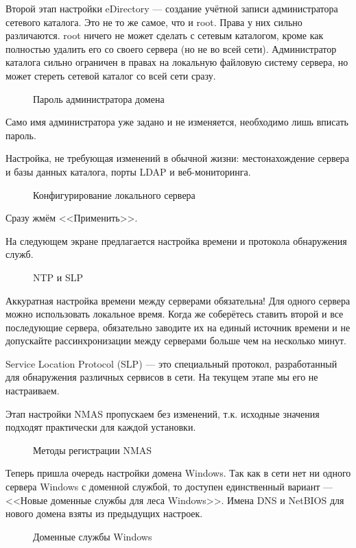 Второй этап настройки eDirectory --- создание учётной записи администратора сетевого каталога. Это не то же самое, что и root. Права у них сильно различаются. root ничего не может сделать с сетевым каталогом, кроме как полностью удалить его со своего сервера (но не во всей сети). Администратор каталога сильно ограничен в правах на локальную файловую систему сервера, но может стереть сетевой каталог со всей сети сразу.
\begin{figure}[H]
\caption{Пароль администратора домена}
\end{figure}
Само имя администратора уже задано и не изменяется, необходимо лишь вписать пароль.
\clearpage

Настройка, не требующая изменений в обычной жизни: местонахождение сервера и базы данных каталога, порты LDAP и веб-мониторинга.
\begin{figure}[H]
\caption{Конфигурирование локального сервера}
\end{figure}
Сразу жмём <<Применить>>.
\clearpage

На следующем экране предлагается настройка времени и протокола обнаружения служб.
\begin{figure}[H]
\caption{NTP и SLP}
\end{figure}
Аккуратная настройка времени между серверами обязательна! Для одного сервера можно использовать локальное время. Когда же соберётесь ставить второй и все последующие сервера, обязательно заводите их на единый источник времени и не допускайте рассинхронизации между серверами больше чем на несколько минут.\par
Service Location Protocol (SLP) --- это специальный протокол, разработанный для обнаружения различных сервисов в сети. На текущем этапе мы его не настраиваем.
\clearpage

Этап настройки NMAS пропускаем без изменений, т.к. исходные значения подходят практически для каждой установки.
\begin{figure}[H]
\caption{Методы регистрации NMAS}
\end{figure}
\clearpage

Теперь пришла очередь настройки домена Windows. Так как в сети нет ни одного сервера Windows с доменной службой, то доступен единственный вариант --- <<Новые доменные службы для леса Windows>>. Имена DNS и NetBIOS для нового домена взяты из предыдущих настроек. 
\begin{figure}[H]
\caption{Доменные службы Windows}
\end{figure}
\clearpage


